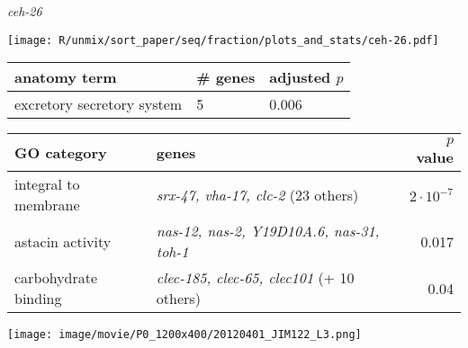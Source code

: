 \documentclass[serif,9pt]{beamer}
\begin{document}
\begin{frame}{{\em ceh-26}}

\begin{minipage}{0.4\textwidth}
\texttt{[image: R/unmix/sort\_paper/seq/fraction/plots\_and\_stats/ceh-26.pdf]}
\end{minipage}
\begin{minipage}{0.58\textwidth}
\begin{table}[!tbp]\scriptsize
\begin{tabular}{lll}
anatomy term & \# genes & adjusted $p$ \\
\hline
excretory secretory system & 5 & 0.006 \\
\end{tabular}
\end{table}
\end{minipage}

\begin{table}\footnotesize
\begin{tabular}{llr}
GO category & genes & $p$ value \\
\hline
integral to membrane & {\em srx-47, vha-17, clc-2} (23 others) & $2 \cdot 10^{-7}$ \\
astacin activity & {\em nas-12, nas-2, Y19D10A.6, nas-31, toh-1} & 0.017 \\
carbohydrate binding & {\em clec-185, clec-65, clec101} (+ 10 others) & 0.04 \\
\end{tabular}
\end{table}

\texttt{[image: image/movie/P0\_1200x400/20120401\_JIM122\_L3.png]}

\end{frame}
\end{document}
